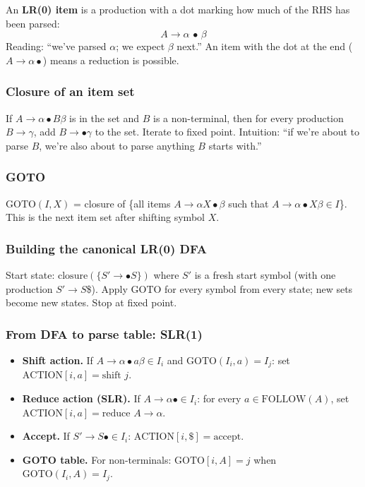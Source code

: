 \documentclass[11pt,a4paper]{article}
\begin{document}
An \textbf{LR(0) item} is a production with a dot marking how much of the RHS has been parsed:
$$A \to \alpha \,\bullet\, \beta$$
Reading: ``we've parsed $\alpha$; we expect $\beta$ next.'' An item with the dot at the end ($A \to \alpha \bullet$) means a reduction is possible.

\subsubsection*{Closure of an item set}

If $A \to \alpha \bullet B \beta$ is in the set and $B$ is a non-terminal, then for every production $B \to \gamma$, add $B \to \bullet \gamma$ to the set. Iterate to fixed point. Intuition: ``if we're about to parse $B$, we're also about to parse anything $B$ starts with.''

\subsubsection*{GOTO}

$\text{GOTO}(I, X)$ = closure of \{all items $A \to \alpha X \bullet \beta$ such that $A \to \alpha \bullet X \beta \in I$\}. This is the next item set after shifting symbol $X$.

\subsubsection*{Building the canonical LR(0) DFA}

Start state: $\text{closure}(\{S' \to \bullet S\})$ where $S'$ is a fresh start symbol (with one production $S' \to S$\$). Apply $\text{GOTO}$ for every symbol from every state; new sets become new states. Stop at fixed point.

\subsubsection*{From DFA to parse table: SLR(1)}

\begin{itemize}[leftmargin=*,itemsep=0pt]
  \item \textbf{Shift action.} If $A \to \alpha \bullet a \beta \in I_i$ and $\text{GOTO}(I_i, a) = I_j$: set $\text{ACTION}[i, a] = \text{shift } j$.
  \item \textbf{Reduce action (SLR).} If $A \to \alpha \bullet \in I_i$: for every $a \in \text{FOLLOW}(A)$, set $\text{ACTION}[i, a] = \text{reduce } A \to \alpha$.
  \item \textbf{Accept.} If $S' \to S\bullet \in I_i$: $\text{ACTION}[i, \$] = \text{accept}$.
  \item \textbf{GOTO table.} For non-terminals: $\text{GOTO}[i, A] = j$ when $\text{GOTO}(I_i, A) = I_j$.
\end{itemize}
\end{document}
